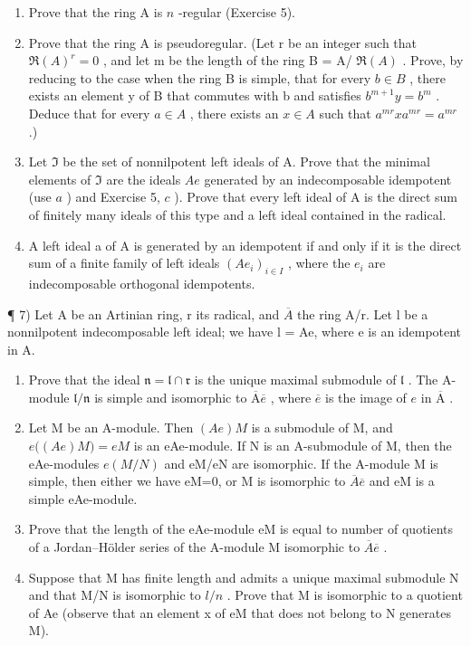 \begin{enumerate}
\def\labelenumi{\alph{enumi})}
\item
  Prove that the ring A is \(n\) -regular (Exercise 5).
\item
  Prove that the ring A is pseudoregular. (Let r be an integer such that \(\Re(A)^{r}=0\) , and let m be the length of the ring B = A/ \(\Re(A)\) . Prove, by reducing to the case when the ring B is simple, that for every \(b\in B\) , there exists an element y of B that commutes with b and satisfies \(b^{m+1}y=b^{m}\) . Deduce that for every \(a\in A\) , there exists an \(x\in A\) such that \(a^{mr}xa^{mr}=a^{mr}\) .)
\item
  Let \(\mathfrak{I}\) be the set of nonnilpotent left ideals of A. Prove that the minimal elements of \(\mathfrak{I}\) are the ideals \(Ae\) generated by an indecomposable idempotent (use \(a\) ) and Exercise 5, \(c\) ). Prove that every left ideal of A is the direct sum of finitely many ideals of this type and a left ideal contained in the radical.
\item
  A left ideal a of A is generated by an idempotent if and only if it is the direct sum of a finite family of left ideals \((Ae_{i})_{i\in I}\) , where the \(e_{i}\) are indecomposable orthogonal idempotents.
\end{enumerate}

¶ 7) Let A be an Artinian ring, r its radical, and \(\overline{A}\) the ring A/r. Let l be a nonnilpotent indecomposable left ideal; we have l = Ae, where e is an idempotent in A.

\begin{enumerate}
\def\labelenumi{\alph{enumi})}
\item
  Prove that the ideal \(\mathfrak{n} = \mathfrak{l} \cap \mathfrak{r}\) is the unique maximal submodule of \(\mathfrak{l}\) . The A-module \(\mathfrak{l} / \mathfrak{n}\) is simple and isomorphic to \(\overline{\mathrm{A}}\overline{e}\) , where \(\overline{e}\) is the image of \(e\) in \(\overline{\mathrm{A}}\) .
\item
  Let M be an A-module. Then \((Ae)M\) is a submodule of M, and \(e\big((Ae)M\big)=eM\) is an eAe-module. If N is an A-submodule of M, then the eAe-modules \(e(M/N)\) and eM/eN are isomorphic. If the A-module M is simple, then either we have eM=0, or M is isomorphic to \(\overline{A}\overline{e}\) and eM is a simple eAe-module.
\item
  Prove that the length of the eAe-module eM is equal to number of quotients of a Jordan--Hölder series of the A-module M isomorphic to \(\overline{A}\overline{e}\) .
\item
  Suppose that M has finite length and admits a unique maximal submodule N and that M/N is isomorphic to \(l/n\) . Prove that M is isomorphic to a quotient of Ae (observe that an element x of eM that does not belong to N generates M).
\end{enumerate}

